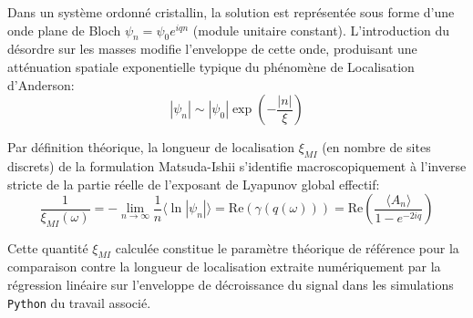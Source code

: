 Dans un système ordonné cristallin, la solution est représentée sous forme d'une onde plane de Bloch $\psi_n = \psi_0 e^{iqn}$ (module unitaire constant). L'introduction du désordre sur les masses modifie l'enveloppe de cette onde, produisant une atténuation spatiale exponentielle typique du phénomène de Localisation d'Anderson:
\begin{equation*}
    |\psi_n| \sim |\psi_0| \exp \left( - \frac{|n|}{\xi} \right)
\end{equation*}

Par définition théorique, la longueur de localisation $\xi_{MI}$ (en nombre de sites discrets) de la formulation Matsuda-Ishii s'identifie macroscopiquement à l'inverse stricte de la partie réelle de l'exposant de Lyapunov global effectif:
\begin{equation*}
    \frac{1}{\xi_{MI}(\omega)} = -\lim_{n \to \infty} \frac{1}{n} \langle \ln |\psi_n| \rangle = \text{Re} \left( \gamma(q(\omega)) \right) = \text{Re} \left( \frac{\langle A_n \rangle}{1 - e^{-2iq}} \right)
\end{equation*}

Cette quantité $\xi_{MI}$ calculée constitue le paramètre théorique de référence pour la comparaison contre la longueur de localisation extraite numériquement par la régression linéaire sur l'enveloppe de décroissance du signal dans les simulations \verb|Python| du travail associé.
